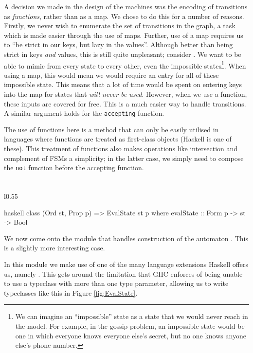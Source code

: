 \documentclass[ %
                    author={Leo Poulson},
                supervisor={Dr. Steven Ramsay},
                    degree={BSc},
                     title={Epistemic Planning for the Dynamic Gossip problem},
                  subtitle={},
                      year={2019} ]{dissertation}
\begin{document}
A decision we made in the design of the machines was the encoding of transitions
as \emph{functions}, rather than as a map. We chose to do this for a number of
reasons. Firstly, we never wish to enumerate the set of transitions in the
graph, a task which is made easier through the use of maps. Further, use of a
map requires us to ``be strict in our keys, but lazy in the values''. Although
better than being strict in keys \emph{and} values, this is still quite
unpleasant; consider \mestar. We want to be able to mimic from every state to
every other, even the impossible states\footnote{We can imagine an
  ``impossible'' state as a state that we would never reach in the model. For
  example, in the gossip problem, an impossible state would be one in which
  everyone knows everyone else's secret, but no one knows anyone else's phone
  number.}. When using a map, this would mean we would require an entry for all
of these impossible state. This means that a lot of time would be spent on
entering keys into the map for states that \emph{will never be used}. However,
when we use a function, these inputs are covered for free. This is a much easier
way to handle transitions. A similar argument holds for the
\texttt{accepting} function.

The use of functions here is a method that can only be easily utilised in
languages where functions are treated as first-class objects (Haskell is one of
these). This treatment of functions also makes operations like intersection and
complement of FSMs a simplicity; in the latter case, we simply need to compose
the \texttt{not} function before the accepting function. 

\section{}
\label{sec:MEHaskell}

\begin{wrapfigure}{l}{0.55\textwidth}
  \begin{cminted}{haskell}
    class (Ord st, Prop p) => EvalState st p where
      evalState :: Form p -> st -> Bool
\end{cminted}
  \caption{}
  \label{fig:EvalState}
\end{wrapfigure}

We now come onto the module that handles construction of the automaton \mestar.
This is a slightly more interesting case.

In this module we make use of one of the many language extensions Haskell offers
us, namely . This gets around the limitation that
GHC enforces of being unable to use a typeclass with more than one type
parameter, allowing us to write typeclasses like this in Figure
\ref{fig:EvalState}.
\end{document}
